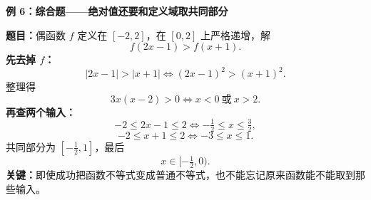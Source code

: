 \clearpage
\begin{examplebox}
\textbf{\textcolor{CExample}{例 6：综合题——绝对值还要和定义域取共同部分}}



\textbf{题目：}偶函数 $f$ 定义在 $[-2,2]$，在 $[0,2]$ 上严格递增，解
\[
 f(2x-1)>f(x+1).
\]
\textbf{先去掉 $f$：}
\[
 |2x-1|>|x+1|\iff (2x-1)^2>(x+1)^2.
\]
整理得
\[
 3x(x-2)>0\iff x<0\ \text{或}\ x>2.
\]
\textbf{再查两个输入：}
\[
 -2\leqslant2x-1\leqslant2\iff-\tfrac12\leqslant x\leqslant\tfrac32,
\]
\[
 -2\leqslant x+1\leqslant2\iff-3\leqslant x\leqslant1.
\]
共同部分为 $[-\frac12,1]$，最后
\[
\boxed{x\in[-\tfrac12,0)}.
\]
\textbf{关键：}即使成功把函数不等式变成普通不等式，也不能忘记原来函数能不能取到那些输入。
\end{examplebox}
